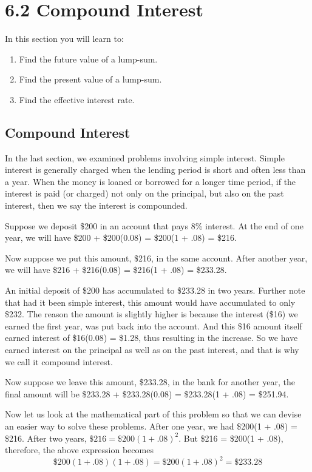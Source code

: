 \section{6.2 Compound Interest}

In this section you will learn to:
\begin{enumerate}
    \item Find the future value of a lump-sum.
    \item Find the present value of a lump-sum.
    \item Find the effective interest rate.
\end{enumerate}

\subsection{Compound Interest}
In the last section, we examined problems involving simple interest. Simple interest is generally charged when the lending period is short and often less than a year. When the money is loaned or borrowed for a longer time period, if the interest is paid (or charged) not only on the principal, but also on the past interest, then we say the interest is compounded.

Suppose we deposit \$200 in an account that pays 8\% interest. At the end of one year, we will have \$200 + \$200(0.08) = \$200(1 + .08) = \$216.

Now suppose we put this amount, \$216, in the same account. After another year, we will have \$216 + \$216(0.08) = \$216(1 + .08) = \$233.28.

An initial deposit of \$200 has accumulated to \$233.28 in two years. Further note that had it been simple interest, this amount would have accumulated to only \$232. The reason the amount is slightly higher is because the interest (\$16) we earned the first year, was put back into the account. And this \$16 amount itself earned interest of \$16(0.08) = \$1.28, thus resulting in the increase. So we have earned interest on the principal as well as on the past interest, and that is why we call it compound interest.

Now suppose we leave this amount, \$233.28, in the bank for another year, the final amount will be \$233.28 + \$233.28(0.08) = \$233.28(1 + .08) = \$251.94.

Now let us look at the mathematical part of this problem so that we can devise an easier way to solve these problems. After one year, we had \$200(1 + .08) = \$216.
After two years, $\$216 = \$200(1 + .08)^2$.
But \$216 = \$200(1 + .08), therefore, the above expression becomes
\[ \$200(1+.08)(1+.08) = \$200(1+.08)^2=\$233.28 \]

